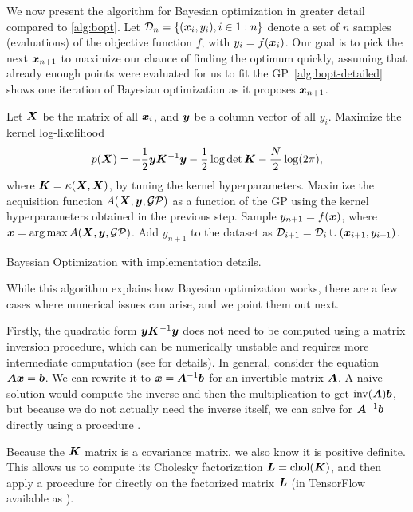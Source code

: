 We now present the algorithm for Bayesian optimization in greater detail
compared to \autoref{alg:bopt}. Let $\mathcal{D}_n = \{ ({\boldsymbol{x}}_i, y_i), i \in 1:n\}$ denote
a set of $n$ samples (evaluations) of the objective function $f$, with $y_i =
f({\boldsymbol{x}}_i)$. Our goal is to pick the next ${\boldsymbol{x}}_{n+1}$ to maximize our chance of
finding the optimum quickly, assuming that already enough points were evaluated
for us to fit the GP. \autoref{alg:bopt-detailed} shows one iteration of
Bayesian optimization as it proposes ${\boldsymbol{x}}_{n+1}$.

\begin{algorithm}
	\DontPrintSemicolon
	\SetAlgoLined
	Let ${\bm{X}}$ be the matrix of all ${\boldsymbol{x}}_i$, and ${\boldsymbol{y}}$ be a column vector of all $y_i$. \;
	Maximize the kernel log-likelihood $$p({\bm{X}}) = -\frac{1}{2}{\boldsymbol{y}} {\bm{K}}^{-1}{\boldsymbol{y}} - \frac{1}{2} \log \det {\bm{K}} - \frac{N}{2} \log (2 \pi),$$ where ${\bm{K}} = \kappa({\bm{X}}, {\bm{X}})$, by tuning the kernel hyperparameters. \;
	Maximize the acquisition function $A({\bm{X}}, {\boldsymbol{y}}, \mathcal{G}\mathcal{P})$ as a function of the GP using the kernel hyperparameters obtained in the previous step. \;
	Sample $y_{n+1} = f({\boldsymbol{x}})$, where ${\boldsymbol{x}} = \operatorname*{arg\,max} A({\bm{X}}, {\boldsymbol{y}}, \mathcal{G}\mathcal{P})$. \;
  Add $y_{n+1}$ to the dataset as $\mathcal{D}_{i+1} = \mathcal{D}_i \cup ({\boldsymbol{x}}_{i+1}, y_{i+1})$.
	\caption{Bayesian Optimization with implementation details.}
	\label{alg:bopt-detailed}
\end{algorithm}

While this algorithm explains how Bayesian optimization works, there are a few
cases where numerical issues can arise, and we point them out next.

Firstly, the quadratic form ${\boldsymbol{y}} {\bm{K}}^{-1} {\boldsymbol{y}}$ does not need to be computed
using a matrix inversion procedure, which can be numerically unstable and
requires more intermediate computation (see
\cite{cholesky-inverse-krishnamoorthy2013matrix} for details). In general,
consider the equation ${\bm{A}} {\boldsymbol{x}} = {\boldsymbol{b}}$. We can rewrite it to ${\boldsymbol{x}} = {\bm{A}}^{-1}
{\boldsymbol{b}}$ for an invertible matrix ${\bm{A}}$. A naive solution would compute the inverse
and then the multiplication to get $\operatorname{inv}({\bm{A}}) {\boldsymbol{b}}$, but because we do not
actually need the inverse itself, we can solve for ${\bm{A}}^{-1} {\boldsymbol{b}}$ directly
using a  procedure \citep{numpy}.

Because the ${\bm{K}}$ matrix is a covariance matrix, we also know it is positive
definite. This allows us to compute its Cholesky factorization ${\bm{L}} =
\operatorname{chol}({\bm{K}})$, and then apply a procedure for  directly on the
factorized matrix ${\bm{L}}$ (in TensorFlow available as
).

